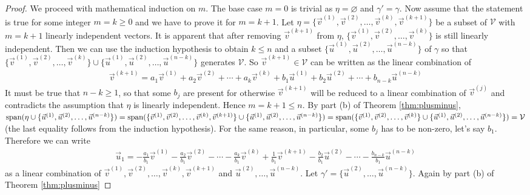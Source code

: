 \begin{proof}
We proceed with mathematical induction on $m$. The base case $m = 0$ is trivial as $\mathcal{\eta} = \varnothing$ and $\mathcal{\gamma'} = \mathcal{\gamma}$. Now assume that the statement is true for some integer $m = k \geq 0$ and we have to prove it for $m = k+1$. Let $\mathcal{\eta} = \{\vec{v}^{(1)}, \vec{v}^{(2)}, \ldots, \vec{v}^{(k)}, \vec{v}^{(k+1)}\}$ be a subset of $\mathcal{V}$ with $m = k+1$ linearly independent vectors. It is apparent that after removing $\vec{v}^{(k+1)}$ from $\mathcal{\eta}$, $\{\vec{v}^{(1)}, \vec{v}^{(2)}, \ldots, \vec{v}^{(k)}\}$ is still linearly independent. Then we can use the induction hypothesis to obtain $k \leq n$ and a subset $\{\vec{u}^{(1)}, \vec{u}^{(2)}, \ldots, \vec{u}^{(n-k)}\}$ of $\mathcal{\gamma}$ so that $\{\vec{v}^{(1)}, \vec{v}^{(2)}, \ldots, \vec{v}^{(k)}\} \cup \{\vec{u}^{(1)}, \vec{u}^{(2)}, \ldots, \vec{u}^{(n-k)}\}$ generates $\mathcal{V}$. So $\vec{v}^{(k+1)} \in \mathcal{V}$ can be written as the linear combination of
\begin{align*}
\vec{v}^{(k+1)} = a_1\vec{v}^{(1)} + a_2\vec{v}^{(2)} + \cdots + a_k\vec{v}^{(k)} + b_1\vec{u}^{(1)} + b_2\vec{u}^{(2)} + \cdots + b_{n-k}\vec{u}^{(n-k)} 
\end{align*}
It must be true that $n - k \geq 1$, so that some $b_j$ are present for otherwise $\vec{v}^{(k+1)}$ will be reduced to a linear combination of $\vec{v}^{(j)}$ and contradicts the assumption that $\mathcal{\eta}$ is linearly independent. Hence $m = k + 1 \leq n$. By part (b) of Theorem \ref{thm:plusminus}, $\text{span}(\mathcal{\eta} \cup \{\vec{u}^{(1)}, \vec{u}^{(2)}, \ldots, \vec{u}^{(n-k)}\}) = \text{span}(\{\vec{v}^{(1)}, \vec{v}^{(2)}, \ldots, \vec{v}^{(k)}, \vec{v}^{(k+1)}\} \cup \{\vec{u}^{(1)}, \vec{u}^{(2)}, \ldots, \vec{u}^{(n-k)}\}) = \text{span}(\{\vec{v}^{(1)}, \vec{v}^{(2)}, \ldots, \vec{v}^{(k)}\} \cup \{\vec{u}^{(1)}, \vec{u}^{(2)}, \ldots, \vec{u}^{(n-k)}\}) \\ = \mathcal{V}$ (the last equality follows from the induction hypothesis). For the same reason, in particular, some $b_j$ has to be non-zero, let's say $b_1$. Therefore we can write
\begin{align*}
\vec{u}_1 = -\frac{a_1}{b_1}\vec{v}^{(1)} -\frac{a_2}{b_1}\vec{v}^{(2)} - \cdots - \frac{a_k}{b_1}\vec{v}^{(k)} + \frac{1}{b_1}\vec{v}^{(k+1)} - \frac{b_2}{b_1}\vec{u}^{(2)} - \cdots - \frac{b_{n-k}}{b_1}\vec{u}^{(n-k)}
\end{align*}
as a linear combination of $\vec{v}^{(1)}, \vec{v}^{(2)}, \ldots, \vec{v}^{(k)}, \vec{v}^{(k+1)}$ and $\vec{u}^{(2)}, \ldots, \vec{u}^{(n-k)}$. Let $\mathcal{\gamma}' = \{\vec{u}^{(2)}, \ldots, \vec{u}^{(n-k)}\}$. Again by part (b) of Theorem \ref{thm:plusminus}

\end{proof}
